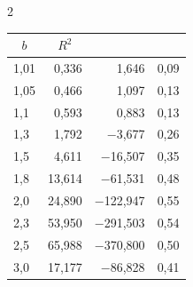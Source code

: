 \begin{multicols}{2}
\begin{table}[b]
\begin{minipage}[t]{80mm}
\begin{center}
\begin{tabular}{|l|r|r|r|}
\multicolumn{1}{c|}{$b$} & \multicolumn{1}{c|}{$R^2$} \\ 


\hline


1,01 & 0,336 & 1,646 & 0,09 \\


1,05 & 0,466 & 1,097 & 0,13 \\


1,1 & 0,593 & 0,883 & 0,13 \\


1,3 & 1,792 & $-$3,677 & 0,26 \\


1,5 & 4,611 & $-$16,507 & 0,35 \\


1,8 & 13,614 & $-$61,531 & 0,48 \\


2,0 & 24,890 & $-$122,947 & 0,55 \\


2,3 & 53,950 & $-$291,503 & 0,54 \\


2,5 & 65,988 & $-$370,800 & 0,50 \\


3,0 & 17,177 & $-$86,828 & 0,41 \\


 \hline


\end{tabular}


\end{center}


\end{minipage}




\hfill




\begin{minipage}[t]{80mm}


\begin{center}


\parbox{50mm}{


}





\vspace*{2ex}






\end{center}
\end{minipage}
\end{table}
\end{multicols}
